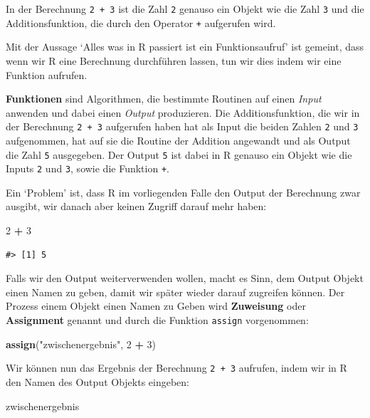 \documentclass[]{book}
\newenvironment{Shaded}{\begin{snugshade}}{\end{snugshade}}
\newcommand{\KeywordTok}[1]{\textcolor[rgb]{0.13,0.29,0.53}{\textbf{#1}}}
\newcommand{\DecValTok}[1]{\textcolor[rgb]{0.00,0.00,0.81}{#1}}
\newcommand{\StringTok}[1]{\textcolor[rgb]{0.31,0.60,0.02}{#1}}
\newcommand{\OperatorTok}[1]{\textcolor[rgb]{0.81,0.36,0.00}{\textbf{#1}}}
\newcommand{\NormalTok}[1]{#1}
\begin{document}
In der Berechnung \texttt{2\ +\ 3} ist die Zahl \texttt{2} genauso ein
Objekt wie die Zahl \texttt{3} und die Additionsfunktion, die durch den
Operator \texttt{+} aufgerufen wird.

Mit der Aussage `Alles was in R passiert ist ein Funktionsaufruf' ist
gemeint, dass wenn wir R eine Berechnung durchführen lassen, tun wir
dies indem wir eine Funktion aufrufen.

\textbf{Funktionen} sind Algorithmen, die bestimmte Routinen auf einen
\emph{Input} anwenden und dabei einen \emph{Output} produzieren. Die
Additionsfunktion, die wir in der Berechnung \texttt{2\ +\ 3} aufgerufen
haben hat als Input die beiden Zahlen \texttt{2} und \texttt{3}
aufgenommen, hat auf sie die Routine der Addition angewandt und als
Output die Zahl \texttt{5} ausgegeben. Der Output \texttt{5} ist dabei
in R genauso ein Objekt wie die Inputs \texttt{2} und \texttt{3}, sowie
die Funktion \texttt{+}.

Ein `Problem' ist, dass R im vorliegenden Falle den Output der
Berechnung zwar ausgibt, wir danach aber keinen Zugriff darauf mehr
haben:

\begin{Shaded}
\begin{Highlighting}[]
\DecValTok{2} \OperatorTok{+}\StringTok{ }\DecValTok{3}
\end{Highlighting}
\end{Shaded}

\begin{verbatim}
#> [1] 5
\end{verbatim}

Falls wir den Output weiterverwenden wollen, macht es Sinn, dem Output
Objekt einen Namen zu geben, damit wir später wieder darauf zugreifen
können. Der Prozess einem Objekt einen Namen zu Geben wird
\textbf{Zuweisung} oder \textbf{Assignment} genannt und durch die
Funktion \texttt{assign} vorgenommen:

\begin{Shaded}
\begin{Highlighting}[]
\KeywordTok{assign}\NormalTok{(}\StringTok{"zwischenergebnis"}\NormalTok{, }\DecValTok{2} \OperatorTok{+}\StringTok{ }\DecValTok{3}\NormalTok{)}
\end{Highlighting}
\end{Shaded}

Wir können nun das Ergebnis der Berechnung \texttt{2\ +\ 3} aufrufen,
indem wir in R den Namen des Output Objekts eingeben:

\begin{Shaded}
\begin{Highlighting}[]
\NormalTok{zwischenergebnis}
\end{Highlighting}
\end{Shaded}
\end{document}

